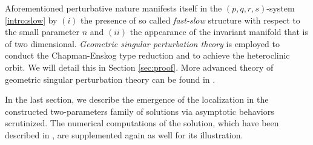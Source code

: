 \documentclass[a4paper,11pt]{article}
\theoremstyle{remark}
\begin{document}
Aforementioned perturbative nature manifests itself in the $(p,q,r,s)$-system \eqref{intro:slow} by $(i)$ the presence of so called {\it fast-slow} structure with respect to the small parameter $n$ and $(ii)$ the appearance of the invariant manifold that is of two dimensional. {\it Geometric singular perturbation theory} is employed to conduct the Chapman-Enskog type reduction and to achieve the heteroclinic orbit. We will detail this in Section \ref{sec:proof}. More advanced theory of geometric singular perturbation theory can be found in \cite{fenichel_asymptotic_1974, fenichel_asymptotic_1977,fenichel_geometric_1979,HPS_1977,Sz1991}.

In the last section, we describe the emergence of the localization in the constructed two-parameters family of solutions via asymptotic behaviors scrutinized. The numerical computations of the solution, which have been described in \cite{KLT_HYP2016}, are supplemented again as well for its illustration. 
\end{document}
